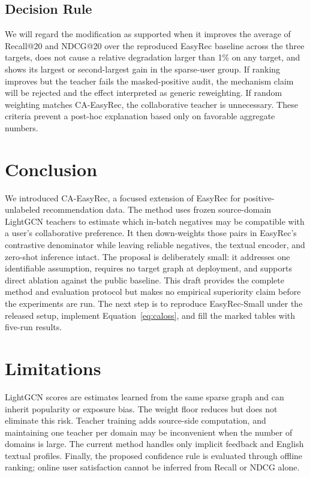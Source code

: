 \documentclass[11pt]{article}
\newcommand{\method}{CA-EasyRec}
\begin{document}
\subsection{Decision Rule}

We will regard the modification as supported when it improves the average of Recall@20 and NDCG@20 over the reproduced EasyRec baseline across the three targets, does not cause a relative degradation larger than 1\% on any target, and shows its largest or second-largest gain in the sparse-user group.
If ranking improves but the teacher fails the masked-positive audit, the mechanism claim will be rejected and the effect interpreted as generic reweighting.
If random weighting matches \method, the collaborative teacher is unnecessary.
These criteria prevent a post-hoc explanation based only on favorable aggregate numbers.

\section{Conclusion}

We introduced \method, a focused extension of EasyRec for positive-unlabeled recommendation data.
The method uses frozen source-domain LightGCN teachers to estimate which in-batch negatives may be compatible with a user's collaborative preference.
It then down-weights those pairs in EasyRec's contrastive denominator while leaving reliable negatives, the textual encoder, and zero-shot inference intact.
The proposal is deliberately small: it addresses one identifiable assumption, requires no target graph at deployment, and supports direct ablation against the public baseline.
This draft provides the complete method and evaluation protocol but makes no empirical superiority claim before the experiments are run.
The next step is to reproduce EasyRec-Small under the released setup, implement Equation~\ref{eq:caloss}, and fill the marked tables with five-run results.

\section*{Limitations}

LightGCN scores are estimates learned from the same sparse graph and can inherit popularity or exposure bias.
The weight floor reduces but does not eliminate this risk.
Teacher training adds source-side computation, and maintaining one teacher per domain may be inconvenient when the number of domains is large.
The current method handles only implicit feedback and English textual profiles.
Finally, the proposed confidence rule is evaluated through offline ranking; online user satisfaction cannot be inferred from Recall or NDCG alone.
\end{document}
